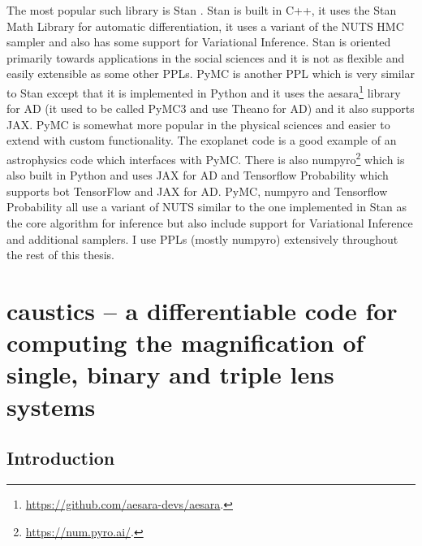 \documentclass[12pt,dvipsnames]{report}
\newcommand{\ssf}[1]{\textsf{#1}}
\begin{document}
The most popular such library is \ssf{Stan} \citep{2017JSS....76....1C}. 
Stan is built in \ssf{C++}, it uses the \ssf{Stan Math Library} for automatic 
differentiation, it uses a variant of the NUTS HMC sampler and also has some 
support for Variational Inference. \ssf{Stan} is oriented primarily towards 
applications in the social sciences and it is not as flexible and easily extensible 
as some other PPLs. \ssf{PyMC} is another PPL which is very similar to 
\ssf{Stan} except that it is implemented in \ssf{Python} and it uses 
the \ssf{aesara}\footnote{\url{https://github.com/aesara-devs/aesara}.} library 
for AD (it used to be called \ssf{PyMC3} and use \ssf{Theano} for AD) and it 
also supports \ssf{JAX}. 
\ssf{PyMC} is somewhat more popular in the physical sciences and easier to 
extend  with custom functionality. The \ssf{exoplanet} code 
\citep{2021JOSS....6.3285F} is a good example of an astrophysics code which 
interfaces with \ssf{PyMC}.  There is also 
\ssf{numpyro}\footnote{\url{https://num.pyro.ai/}.}
\citep{arXiv:1912.11554} which is also built in \ssf{Python} and uses 
\ssf{JAX} for AD and \ssf{Tensorflow Probability} \citep{arXiv:1711.10604} 
which supports bot \ssf{TensorFlow} and \ssf{JAX} for AD. \ssf{PyMC}, \ssf{numpyro}
and \ssf{Tensorflow Probability} all use a variant of NUTS similar to the one 
implemented in \ssf{Stan} as the core algorithm for inference but also 
include support for Variational Inference and additional samplers. 
I use PPLs (mostly \ssf{numpyro}) extensively throughout the rest of this thesis.

\chapter{\ssf{caustics} -- a differentiable code for computing the
  magnification of single, binary and triple lens systems}
\label{ch:caustics}

\section{Introduction}
\end{document}
